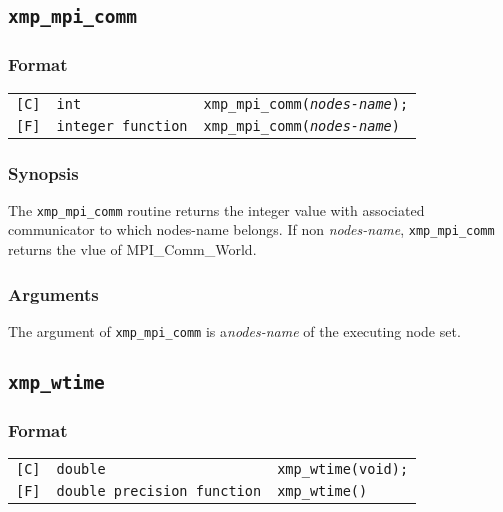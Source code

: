 \vspace{0.3cm}

\subsection{\tt xmp\_mpi\_comm}

\subsubsection*{Format}

\begin{tabular}{lll}

\verb![C]!&  {\tt int}& {\tt xmp\_mpi\_comm({\it nodes-name});}\\

\verb![F]!&  {\tt integer function}& {\tt xmp\_mpi\_comm({\it nodes-name})}

\end{tabular}

\subsubsection*{Synopsis}
     The {\tt xmp\_mpi\_comm} routine returns the integer value with associated communicator
     to which nodes-name belongs. If non {\it nodes-name}, {\tt xmp\_mpi\_comm} returns 
     the vlue of MPI\_Comm\_World.

\subsubsection*{Arguments}
    The argument of {\tt xmp\_mpi\_comm} is a{\it nodes-name} of the executing node set.


\vspace{0.3cm}

\subsection{\tt xmp\_wtime}

\subsubsection*{Format}

\begin{tabular}{lll}

\verb![C]!&  {\tt double}& {\tt xmp\_wtime(void);}\\

\verb![F]!&  {\tt double precision function}& {\tt xmp\_wtime()}

\end{tabular}

